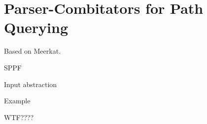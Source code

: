 \section{Parser-Combitators for Path Querying}

Based on Meerkat.

SPPF

Input abstraction

Example

WTF????